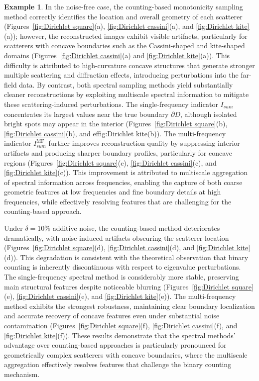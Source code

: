\documentclass[11pt,reqno,twoside]{amsart}
\theoremstyle{definition}
\newtheorem{example}{Example}[section]
\theoremstyle{remark}
\numberwithin{equation}{section}
\begin{document}
\begin{example}
In the noise-free case, the counting-based monotonicity sampling method correctly identifies the location and overall geometry of each scatterer (Figures~\ref{fig:Dirichlet square}(a), \ref{fig:Dirichlet cassini}(a), and \ref{fig:Dirichlet kite}(a)); however, the reconstructed images exhibit visible artifacts, particularly for scatterers with concave boundaries such as the Cassini-shaped and kite-shaped domains (Figures~\ref{fig:Dirichlet cassini}(a) and \ref{fig:Dirichlet kite}(a)). This difficulty is attributed to high-curvature concave structures that generate stronger multiple scattering and diffraction effects, introducing perturbations into the far-field data. By contrast, both spectral sampling methods yield substantially cleaner reconstructions by exploiting multiscale spectral information to mitigate these scattering-induced perturbations. The single-frequency indicator $I_{sum}$ concentrates its largest values near the true boundary $\partial D$, although isolated bright spots may appear in the interior (Figures~\ref{fig:Dirichlet square}(b), \ref{fig:Dirichlet cassini}(b), and ef{fig:Dirichlet kite}(b)). The multi-frequency indicator $I_{sum}^{\mathrm{MF}}$ further improves reconstruction quality by suppressing interior artifacts and producing sharper boundary profiles, particularly for concave regions (Figures~\ref{fig:Dirichlet square}(c), \ref{fig:Dirichlet cassini}(c), and \ref{fig:Dirichlet kite}(c)). This improvement is attributed to multiscale aggregation of spectral information across frequencies, enabling the capture of both coarse geometric features at low frequencies and fine boundary details at high frequencies, while effectively resolving features that are challenging for the counting-based approach.

Under $\delta = 10\%$ additive noise, the counting-based method deteriorates dramatically, with noise-induced artifacts obscuring the scatterer location (Figures~\ref{fig:Dirichlet square}(d), \ref{fig:Dirichlet cassini}(d), and \ref{fig:Dirichlet kite}(d)). This degradation is consistent with the theoretical observation that binary counting is inherently discontinuous with respect to eigenvalue perturbations. The single-frequency spectral method is considerably more stable, preserving main structural features despite noticeable blurring (Figures~\ref{fig:Dirichlet square}(e), \ref{fig:Dirichlet cassini}(e), and \ref{fig:Dirichlet kite}(e)). The multi-frequency method exhibits the strongest robustness, maintaining clear boundary localization and accurate recovery of concave features even under substantial noise contamination (Figures~\ref{fig:Dirichlet square}(f), \ref{fig:Dirichlet cassini}(f), and \ref{fig:Dirichlet kite}(f)). These results demonstrate that the spectral methods' advantage over counting-based approaches is particularly pronounced for geometrically complex scatterers with concave boundaries, where the multiscale aggregation effectively resolves features that challenge the binary counting mechanism.

\end{example}
\end{document}
